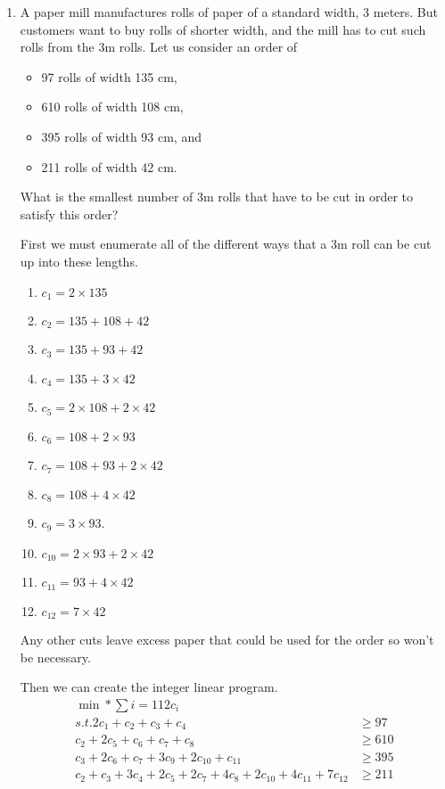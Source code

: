 \documentclass[11pt, oneside]{article}
\begin{document}
\begin{enumerate}
    \item %
        A paper mill manufactures rolls of paper of a standard width, 3 meters.
        But customers want to buy rolls of shorter width, and the mill has to
        cut such rolls from the 3m rolls.
        Let us consider an order of
        \begin{itemize}
            \item 97 rolls of width 135 cm,
            \item 610 rolls of width 108 cm,
            \item 395 rolls of width 93 cm, and
            \item 211 rolls of width 42 cm.
        \end{itemize}
        What is the smallest number of 3m rolls that have to be cut in order to
        satisfy this order?

        First we must enumerate all of the different ways that a 3m roll can be
        cut up into these lengths.
        \begin{enumerate}
            \item $c_1 = 2 \times 135$
            \item $c_2 = 135 + 108 + 42$
            \item $c_3 = 135 + 93 + 42$
            \item $c_4 = 135 + 3 \times 42$
            \item $c_5 = 2 \times 108 + 2 \times 42$
            \item $c_6 = 108 + 2 \times 93$
            \item $c_7 = 108 + 93 + 2 \times 42$
            \item $c_8 = 108 + 4 \times 42$
            \item $c_9 = 3 \times 93$.
            \item $c_{10} = 2 \times 93 + 2 \times 42$
            \item $c_{11} = 93 + 4 \times 42$
            \item $c_{12} = 7 \times 42$
        \end{enumerate}
        Any other cuts leave excess paper that could be used for the order so
        won't be necessary.

        Then we can create the integer linear program.
        \begin{align*}
            \min* \sum{i = 1}{12}{c_i} \\
            s.t. 
            2c_1 + c_2 + c_3 + c_4 &\ge 97 \\
            c_2 + 2c_5 + c_6 + c_7 + c_8 &\ge 610 \\
            c_3 + 2 c_6 + c_7 + 3c_9 + 2c_{10} + c_{11} &\ge 395 \\
            c_2 + c_3 + 3c_4 + 2c_5 + 2c_7 + 4c_8 + 2c_{10} + 4c_{11} + 7c_{12} &\ge 211
        \end{align*}



\end{enumerate}
\end{document}
